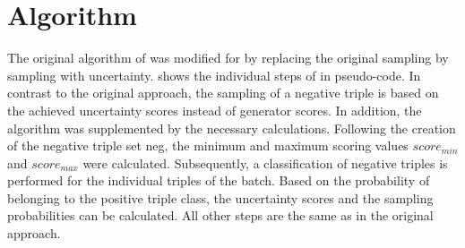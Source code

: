 \section{Algorithm}
\label{sec:algorithm}
The original algorithm of \kbgan was modified for \usgan by replacing the original sampling by sampling with uncertainty.
 shows the individual steps of \usgan in pseudo-code.
In contrast to the original \kbgan approach, the sampling of a negative triple is based on the achieved uncertainty scores instead of generator scores.
In addition, the algorithm was supplemented by the necessary calculations.
Following the creation of the negative triple set neg, the minimum and maximum scoring values $score_{min}$ and $score_{max}$ were calculated.
Subsequently, a classification of negative triples is performed for the individual triples of the batch.
Based on the probability of belonging to the positive triple class, the uncertainty scores and the sampling probabilities can be calculated.
All other steps are the same as in the original \kbgan approach.
\clearpage

